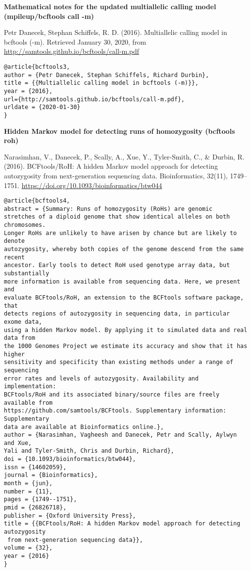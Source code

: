 \documentclass[]{article}
\begin{document}
\textbf{Mathematical notes for the updated multiallelic calling model (mpileup/bcftools call -m)}

Petr Danecek, Stephan Schiffels, R. D. (2016). Multiallelic calling model in bcftools (-m). Retrieved January 30, 2020, from \url{http://samtools.github.io/bcftools/call-m.pdf}

\begin{verbatim}
@article{bcftools3,
author = {Petr Danecek, Stephan Schiffels, Richard Durbin},
title = {{Multiallelic calling model in bcftools (-m)}},
year = {2016},
url={http://samtools.github.io/bcftools/call-m.pdf},
urldate = {2020-01-30}
}
\end{verbatim}

\textbf{Hidden Markov model for detecting runs of homozygosity (bcftools roh)}

Narasimhan, V., Danecek, P., Scally, A., Xue, Y., Tyler-Smith, C., \& Durbin, R. (2016). BCFtools/RoH: A hidden Markov model approach for detecting autozygosity from next-generation sequencing data. Bioinformatics, 32(11), 1749–1751. \url{https://doi.org/10.1093/bioinformatics/btw044}

\begin{verbatim}
@article{bcftools4,
abstract = {Summary: Runs of homozygosity (RoHs) are genomic
stretches of a diploid genome that show identical alleles on both chromosomes.
Longer RoHs are unlikely to have arisen by chance but are likely to denote
autozygosity, whereby both copies of the genome descend from the same recent
ancestor. Early tools to detect RoH used genotype array data, but substantially
more information is available from sequencing data. Here, we present and
evaluate BCFtools/RoH, an extension to the BCFtools software package, that
detects regions of autozygosity in sequencing data, in particular exome data,
using a hidden Markov model. By applying it to simulated data and real data from
the 1000 Genomes Project we estimate its accuracy and show that it has higher
sensitivity and specificity than existing methods under a range of sequencing
error rates and levels of autozygosity. Availability and implementation:
BCFtools/RoH and its associated binary/source files are freely available from
https://github.com/samtools/BCFtools. Supplementary information: Supplementary
data are available at Bioinformatics online.},
author = {Narasimhan, Vagheesh and Danecek, Petr and Scally, Aylwyn and Xue,
Yali and Tyler-Smith, Chris and Durbin, Richard},
doi = {10.1093/bioinformatics/btw044},
issn = {14602059},
journal = {Bioinformatics},
month = {jun},
number = {11},
pages = {1749--1751},
pmid = {26826718},
publisher = {Oxford University Press},
title = {{BCFtools/RoH: A hidden Markov model approach for detecting autozygosity
 from next-generation sequencing data}},
volume = {32},
year = {2016}
}
\end{verbatim}
\end{document}

